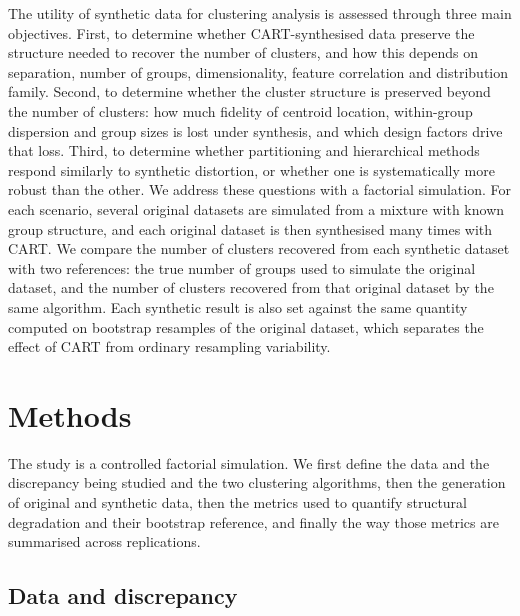\documentclass[pdflatex,referee]{sn-jnl}
\begin{document}
The utility of synthetic data for clustering analysis is assessed through three
main objectives. First, to determine whether CART-synthesised data preserve the
structure needed to recover the number of clusters, and how this depends on
separation, number of groups, dimensionality, feature correlation and
distribution family. Second, to determine whether the cluster structure is
preserved beyond the number of clusters: how much fidelity of centroid
location, within-group dispersion and group sizes is lost under synthesis, and
which design factors drive that loss. Third, to determine whether partitioning
and hierarchical methods respond similarly to synthetic distortion, or whether
one is systematically more robust than the other. We address these questions
with a factorial simulation. For each scenario, several original datasets are
simulated from a mixture with known group structure, and each original dataset
is then synthesised many times with CART. We compare the number of clusters
recovered from each synthetic dataset with two references: the true number of
groups used to simulate the original dataset, and the number of clusters
recovered from that original dataset by the same algorithm. Each synthetic
result is also set against the same quantity computed on bootstrap resamples
of the original dataset, which separates the effect of CART from ordinary
resampling variability.

\section{Methods}

The study is a controlled factorial simulation. We first define the data and
the discrepancy being studied and the two clustering algorithms, then the
generation of original and synthetic data, then the metrics used to quantify
structural degradation and their bootstrap reference, and finally the way
those metrics are summarised across replications.

\subsection{Data and discrepancy}
\end{document}

